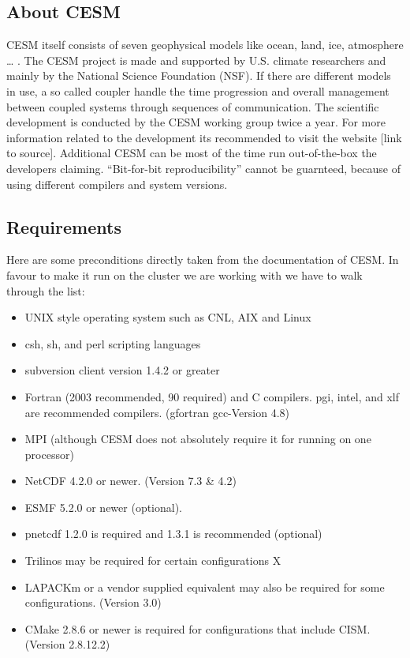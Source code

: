 \documentclass[]{article}
\providecommand{\tightlist}{%
  \setlength{\itemsep}{0pt}\setlength{\parskip}{0pt}}
\begin{document}
\subsection{About CESM}\label{about-cesm}

CESM itself consists of seven geophysical models like ocean, land, ice,
atmosphere \ldots{} . The CESM project is made and supported by U.S.
climate researchers and mainly by the National Science Foundation (NSF).
If there are different models in use, a so called coupler handle the
time progression and overall management between coupled systems through
sequences of communication. The scientific development is conducted by
the CESM working group twice a year. For more information related to the
development its recommended to visit the website {[}link to source{]}.
Additional CESM can be most of the time run out-of-the-box the
developers claiming. ``Bit-for-bit reproducibility'' cannot be
guarnteed, because of using different compilers and system versions.

\subsection{Requirements}\label{requirements}

Here are some preconditions directly taken from the documentation of
CESM. In favour to make it run on the cluster we are working with we
have to walk through the list:

\begin{itemize}
\tightlist
\item
  UNIX style operating system such as CNL, AIX and Linux \checkmark
\item
  csh, sh, and perl scripting languages \checkmark
\item
  subversion client version 1.4.2 or greater \checkmark
\item
  Fortran (2003 recommended, 90 required) and C compilers. pgi, intel,
  and xlf are recommended compilers. \checkmark (gfortran gcc-Version
  4.8)
\item
  MPI (although CESM does not absolutely require it for running on one
  processor) \checkmark
\item
  NetCDF 4.2.0 or newer. \checkmark (Version 7.3 \& 4.2)
\item
  ESMF 5.2.0 or newer (optional).
\item
  pnetcdf 1.2.0 is required and 1.3.1 is recommended (optional)
\item
  Trilinos may be required for certain configurations X
\item
  LAPACKm or a vendor supplied equivalent may also be required for some
  configurations. \checkmark (Version 3.0)
\item
  CMake 2.8.6 or newer is required for configurations that include CISM.
  \checkmark (Version 2.8.12.2)
\end{itemize}
\end{document}

